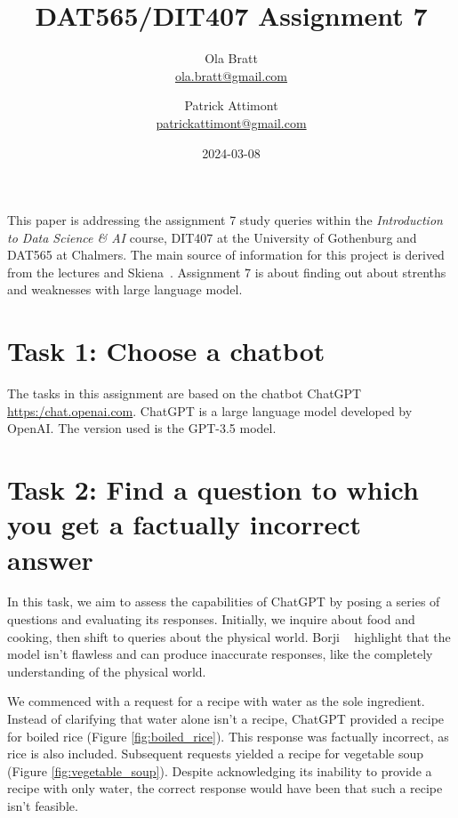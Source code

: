 \documentclass[a4paper]{article}
\begin{document}
\author{Ola Bratt \\
  \href{mailto:ola.bratt@gmail.com}{ola.bratt@gmail.com}
  \and
  Patrick Attimont \\
  \href{patrickattimont@gmail.com}{patrickattimont@gmail.com}
}

\title{DAT565/DIT407 Assignment 7}
\date{2024-03-08}

\maketitle

This paper is addressing the assignment 7 study queries within the \emph{Introduction to Data Science \& AI} course, DIT407 at 
the University of Gothenburg and DAT565 at Chalmers. The main source of information for this project
is derived from the lectures and Skiena~\cite{Skiena:2024}. Assignment 7 is about finding out about strenths and weaknesses with large language model.

\section*{Task 1: Choose a chatbot}

The tasks in this assignment are based on the chatbot ChatGPT \href{https:/chat.openai.com}{https:/chat.openai.com}. 
ChatGPT is a large language model developed by OpenAI.
 The version used is the GPT-3.5 model.

 \section*{Task 2: Find a question to which you get a factually incorrect answer}


 In this task, we aim to assess the capabilities of ChatGPT by posing a series of questions and evaluating its responses. 
 Initially, we inquire about food and cooking, then shift to queries about the physical world. 
 Borji ~\cite{Borji:2023} highlight that the model isn't flawless and can produce inaccurate responses, 
 like the completely understanding of the physical world.


 We commenced with a request for a recipe with water as the sole ingredient. 
 Instead of clarifying that water alone isn't a recipe, ChatGPT provided a recipe for boiled rice (Figure \ref{fig:boiled_rice}). 
 This response was factually incorrect, as rice is also included. 
 Subsequent requests yielded a recipe for vegetable soup (Figure \ref{fig:vegetable_soup}). 
 Despite acknowledging its inability to provide a recipe with only water, the correct response would have been that such a recipe isn't feasible.
 
\end{document}
